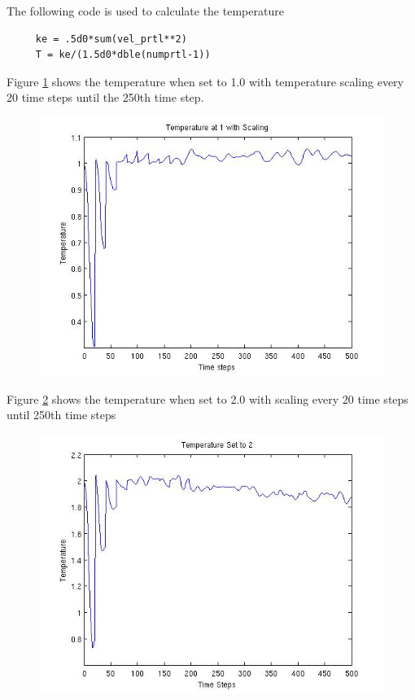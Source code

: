 \documentclass[10pt,a4paper]{article}
\begin{document}
The following code is used to calculate the temperature

\begin{lstlisting}
	 ke = .5d0*sum(vel_prtl**2)
	 T = ke/(1.5d0*dble(numprtl-1))
\end{lstlisting}


Figure \ref{fig:temp1scale} shows the temperature when set to 1.0 with temperature scaling every 20 time steps until the 250th time step. 
\begin{figure}
\centering
\includegraphics[width=0.8\linewidth]{temp1scale}
\caption[Temperature set to 1 with Temperature Scaling]{}
\label{fig:temp1scale}
\end{figure}
Figure \ref{fig:temp2scale} shows the temperature when set to 2.0 with scaling every 20 time steps until 250th time steps
\begin{figure}
	\centering
	\includegraphics[width=0.8\linewidth]{temp2scale}
	\caption[Temperature set to 2 with Temperature Scaling]{}
	\label{fig:temp2scale}
\end{figure}
\end{document}
